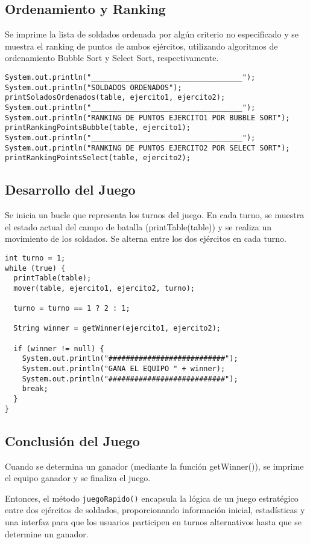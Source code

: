 \subsection{Ordenamiento y Ranking}
Se imprime la lista de soldados ordenada por algún criterio no especificado
y se muestra el ranking de puntos de ambos ejércitos, utilizando algoritmos de ordenamiento Bubble Sort y Select Sort, respectivamente.
\begin{lstlisting}
System.out.println("___________________________________");
System.out.println("SOLDADOS ORDENADOS");
printSoladosOrdenados(table, ejercito1, ejercito2);
System.out.println("___________________________________");
System.out.println("RANKING DE PUNTOS EJERCITO1 POR BUBBLE SORT");
printRankingPointsBubble(table, ejercito1);
System.out.println("___________________________________");
System.out.println("RANKING DE PUNTOS EJERCITO2 POR SELECT SORT");
printRankingPointsSelect(table, ejercito2);
\end{lstlisting}

\subsection{Desarrollo del Juego}
Se inicia un bucle que representa los turnos del juego.
En cada turno, se muestra el estado actual del campo de batalla (printTable(table))
y se realiza un movimiento de los soldados. Se alterna entre los dos ejércitos en cada turno.
\begin{lstlisting}
int turno = 1;
while (true) {
  printTable(table);
  mover(table, ejercito1, ejercito2, turno);

  turno = turno == 1 ? 2 : 1;

  String winner = getWinner(ejercito1, ejercito2);

  if (winner != null) {
    System.out.println("###########################");
    System.out.println("GANA EL EQUIPO " + winner);
    System.out.println("###########################");
    break;
  }
}
\end{lstlisting}

\subsection{Conclusión del Juego}
Cuando se determina un ganador (mediante la función getWinner()),
se imprime el equipo ganador y se finaliza el juego.

Entonces, el método \texttt{juegoRapido()} encapsula la lógica de un juego estratégico entre dos ejércitos de soldados, proporcionando información inicial, estadísticas y una interfaz para que los usuarios participen en turnos alternativos hasta que se determine un ganador.
